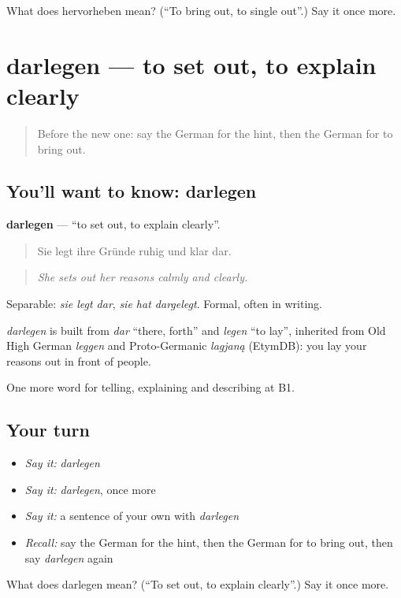 \begin{tcolorbox}[breakable,colback=teal!4,colframe=teal!35!black,title={Before you move on}]
What does hervorheben mean? (\textquotedblleft{}To bring out, to single out\textquotedblright{}.) Say it once more.
\end{tcolorbox}
\section[darlegen]{darlegen — to set out, to explain clearly}

\label{lesson:GE-C339-darlegen}



\begin{quote}
Before the new one: say the German for the hint, then the German for to bring out.
\end{quote}

\subsection*{You'll want to know: darlegen}
\textbf{darlegen} — \textquotedblleft{}to set out, to explain clearly\textquotedblright{}.

\begin{quote}
Sie legt ihre Gründe ruhig und klar dar.
\end{quote}

\begin{quote}
\emph{She sets out her reasons calmly and clearly.}
\end{quote}

Separable: \emph{sie legt dar}, \emph{sie hat dargelegt}. Formal, often in writing.

\begin{cousinweb}
\emph{darlegen} is built from \emph{dar} \textquotedblleft{}there, forth\textquotedblright{} and \emph{legen} \textquotedblleft{}to lay\textquotedblright{}, inherited from Old High German \emph{leggen} and Proto-Germanic \emph{lagjaną} (EtymDB): you lay your reasons out in front of people.
\end{cousinweb}

\begin{grammarlens}[title={What you've built}]
One more word for telling, explaining and describing at B1.
\end{grammarlens}

\subsection*{Your turn}
\begin{itemize}
\raggedright
  \item \emph{Say it:} \emph{darlegen}
  \item \emph{Say it:} \emph{darlegen}, once more
  \item \emph{Say it:} a sentence of your own with \emph{darlegen}
  \item \emph{Recall:} say the German for the hint, then the German for to bring out, then say \emph{darlegen} again
\end{itemize}

\begin{tcolorbox}[breakable,colback=teal!4,colframe=teal!35!black,title={Before you move on}]
What does darlegen mean? (\textquotedblleft{}To set out, to explain clearly\textquotedblright{}.) Say it once more.
\end{tcolorbox}
